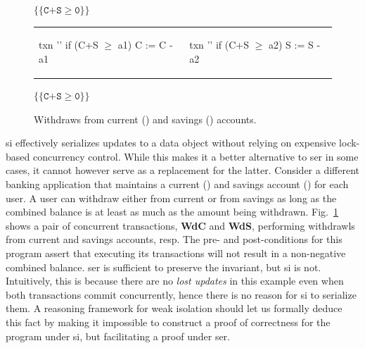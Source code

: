 \begin{figure}
\centering
$\{\{\texttt{C+S}\ge\texttt{0}\}\}$
\begin{tabular}{l||l}
\begin{txnimpcode}
  txn '\B{WdC}' {
    if (C+S $\ge$ a1) {
      C := C - a1
    }
  }
\end{txnimpcode}
&
\begin{txnimpcode}
  txn '\B{WdS}' {
    if (C+S $\ge$ a2) {
      S := S - a2
    }
  }
\end{txnimpcode}
\\
\end{tabular}
$\{\{\texttt{C+S}\ge\texttt{0}\}\}$

\caption{Withdraws from current () and savings () accounts.}
\label{fig:motiv-eg-2}
\end{figure}

{\sc si} effectively serializes updates to a data object without
relying on expensive lock-based concurrency control. While this makes
it a better alternative to {\sc ser} in some cases, it cannot however
serve as a replacement for the latter. Consider a different banking
application that maintains a current () and savings account
() for each user. A user can withdraw either from current or from
savings as long as the combined balance is at least as much as the
amount being withdrawn.  Fig.~\ref{fig:motiv-eg-2} shows a pair of
concurrent transactions, {\bf WdC} and {\bf WdS}, performing
withdrawls from current and savings accounts, resp. The pre-
and post-conditions for this program assert that executing its
transactions will not result in a non-negative combined balance.  {\sc
  ser} is sufficient to preserve the invariant, but {\sc si} is not.
Intuitively, this is because there are no \emph{lost updates} in this
example even when both transactions commit concurrently, hence there
is no reason for {\sc si} to serialize them. A reasoning framework for
weak isolation should let us formally deduce this fact by making it
impossible to construct a proof of correctness for the program under
{\sc si}, but facilitating a proof under {\sc ser}.

